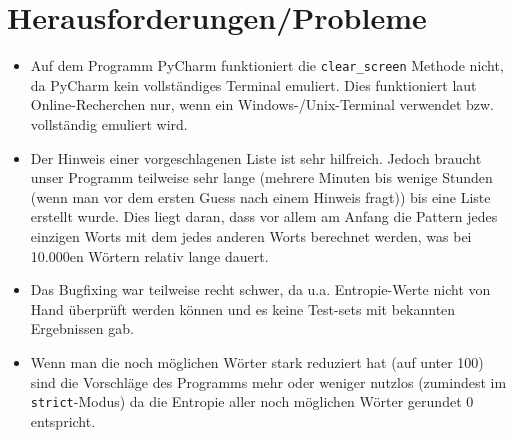\documentclass[12pt]{scrartcl} %
\begin{document}
\section{Herausforderungen/Probleme}
\begin{itemize}
    \item 
         Auf dem Programm PyCharm funktioniert die \texttt{clear\_screen} Methode nicht, da PyCharm kein vollständiges Terminal emuliert. Dies funktioniert laut Online-Recherchen nur, wenn ein Windows-/Unix-Terminal verwendet bzw. vollständig emuliert wird.
    \item 
         Der Hinweis einer vorgeschlagenen Liste ist sehr hilfreich. Jedoch braucht unser Programm teilweise sehr lange (mehrere Minuten bis wenige Stunden (wenn man vor dem ersten Guess nach einem Hinweis fragt)) bis eine Liste erstellt wurde. Dies liegt daran, dass vor allem am Anfang die Pattern jedes einzigen Worts mit dem jedes anderen Worts berechnet werden, was bei 10.000en Wörtern relativ lange dauert.
    \item 
        Das Bugfixing war teilweise recht schwer, da u.a. Entropie-Werte nicht von Hand überprüft werden können und es keine Test-sets mit bekannten Ergebnissen gab.
    \item 
        Wenn man die noch möglichen Wörter stark reduziert hat (auf unter 100) sind die Vorschläge des Programms mehr oder weniger nutzlos (zumindest im \texttt{strict}-Modus) da die Entropie aller noch möglichen Wörter gerundet 0 entspricht. 

\end{itemize}
\end{document}
